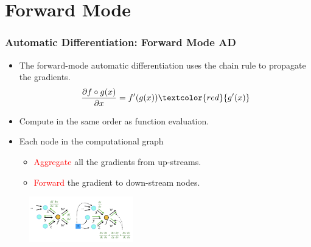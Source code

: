 \documentclass{beamer}
\newcommand{\red}[1]{\textcolor{red}{#1}}
\begin{document}
\section{Forward Mode}



\begin{frame}
	\frametitle{Automatic Differentiation: Forward Mode AD}

	\begin{itemize}
		\item The forward-mode automatic differentiation uses the chain rule to propagate the gradients.
		      $$\frac{\partial f\circ g (x)}{\partial x} =  f'(g(x)) \red{ g'(x)}$$
		\item Compute in the same order as function evaluation.
		\item Each node in the computational graph
		      \begin{itemize}
			      \item \red{Aggregate} all the gradients from up-streams.
			      \item \red{Forward} the gradient to down-stream nodes.
		      \end{itemize}
	\end{itemize}

	\begin{figure}[hbt]
		\includegraphics[width=0.4\textwidth]{figures/fad}
	\end{figure}


\end{frame}
\end{document}
